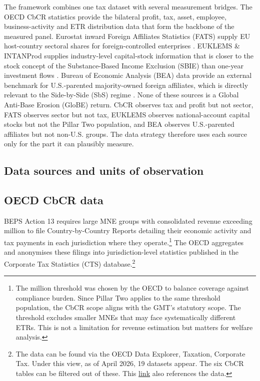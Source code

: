 \documentclass[11pt,a4paper]{article}
\newcommand{\EUR}{\texteuro}
\begin{document}
The framework combines one tax dataset with several measurement bridges. The OECD CbCR statistics provide the bilateral profit, tax, asset, employee, business-activity and ETR distribution data that form the backbone of the measured panel. Eurostat inward Foreign Affiliates Statistics (FATS) supply EU host-country sectoral shares for foreign-controlled enterprises \citep{eurostat2025fats}. EUKLEMS \& INTANProd supplies industry-level capital-stock information that is closer to the stock concept of the Substance-Based Income Exclusion (SBIE) than one-year investment flows \citep{euklemsintanprod2025}. Bureau of Economic Analysis (BEA) data provide an external benchmark for U.S.-parented majority-owned foreign affiliates, which is directly relevant to the Side-by-Side (SbS) regime \citep{bea2025usmne}. None of these sources is a Global Anti-Base Erosion (GloBE) return. CbCR observes tax and profit but not sector, FATS observes sector but not tax, EUKLEMS observes national-account capital stocks but not the Pillar Two population, and BEA observes U.S.-parented affiliates but not non-U.S. groups. The data strategy therefore uses each source only for the part it can plausibly measure.

\subsection{Data sources and units of observation}\label{sec:data_sources_units}


\subsection{OECD CbCR data}\label{CbCR}

BEPS Action 13 requires large MNE groups with consolidated revenue exceeding \EUR750 million to file Country-by-Country Reports detailing their economic activity and tax payments in each jurisdiction where they operate.\footnote{The \EUR750 million threshold was chosen by the OECD to balance coverage against compliance burden. Since Pillar Two applies to the same threshold population, the CbCR scope aligns with the GMT's statutory scope. The threshold excludes smaller MNEs that may face systematically different ETRs. This is not a limitation for revenue estimation but matters for welfare analysis.} The OECD aggregates and anonymises these filings into jurisdiction-level statistics published in the Corporate Tax Statistics (CTS) database.\footnote{The data can be found via the OECD Data Explorer, Taxation, Corporate Tax. Under this view, as of April 2026, 19 datasets appear. The six CbCR tables can be filtered out of these. This \href{https://data-explorer.oecd.org/?fs\%5B0\%5D=Topic\%2C1\%7CTaxation\%23TAX\%23\%7CCorporate\%20tax\%23TAX_CPT\%23&pg=0&fc=Topic&bp=true&snb=19}{link} also references the data.}
\end{document}
